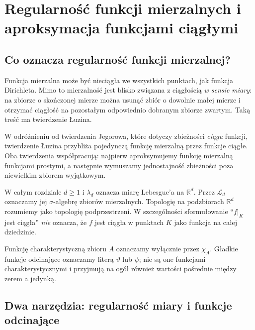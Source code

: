 \chapter[Regularność funkcji mierzalnych]{Regularność funkcji mierzalnych i aproksymacja funkcjami ciągłymi}
\label{ch:regularnosc-funkcji}

\section{Co oznacza regularność funkcji mierzalnej?}

Funkcja mierzalna może być nieciągła we wszystkich punktach,
jak funkcja Dirichleta. Mimo to mierzalność jest blisko
związana z ciągłością \emph{w sensie miary}: na zbiorze o
skończonej mierze można usunąć zbiór o dowolnie małej mierze
i otrzymać ciągłość na pozostałym odpowiednio dobranym
zbiorze zwartym. Taką treść ma twierdzenie Łuzina.

W odróżnieniu od twierdzenia Jegorowa, które dotyczy
zbieżności \emph{ciągu} funkcji, twierdzenie Łuzina
przybliża pojedynczą funkcję mierzalną przez funkcje
ciągłe. Oba twierdzenia współpracują: najpierw
aproksymujemy funkcję mierzalną funkcjami prostymi,
a następnie wymuszamy jednostajność zbieżności
poza niewielkim zbiorem wyjątkowym.

W całym rozdziale $d\ge1$ i $\lambda_d$ oznacza miarę
Lebesgue'a na $\mathbb R^d$. Przez $\mathcal L_d$
oznaczamy jej $\sigma$-algebrę zbiorów mierzalnych.
Topologię na podzbiorach $\mathbb R^d$ rozumiemy jako
topologię podprzestrzeni. W szczególności sformułowanie
``$f|_K$ jest ciągła'' \emph{nie} oznacza,
że $f$ jest ciągła w punktach $K$ jako funkcja na
całej dziedzinie.

\begin{uwaga}
Funkcję charakterystyczną zbioru $A$ oznaczamy
wyłącznie przez $\chi_A$. Gładkie funkcje odcinające
oznaczamy literą $\vartheta$ lub $\psi$; nie są one
funkcjami charakterystycznymi i przyjmują na ogół
również wartości pośrednie między zerem a jedynką.
\end{uwaga}

\section{Dwa narzędzia: regularność miary i funkcje odcinające}

